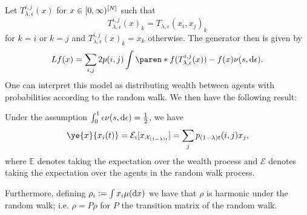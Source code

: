 \documentclass{article}
\begin{document}
Let $T_{\lambda, \epsilon}^{i, j}(x)$ for $x \in [0, \infty)^{[N]}$ such that
\[
T_{\lambda, \epsilon}^{i, j}(x)_k = T_{\lambda, \epsilon}(x_i, x_j)_k
\]
for $k = i$ or $k = j$ and $T_{\lambda, \epsilon}^{i, j}(x)_k = x_k$ otherwise. The generator then is given by
\[
Lf(x) = \sum_{i, j} 2 p(i, j) \int \paren*{f(T_{\lambda, \epsilon}^{i, j}(x)) - f(x)} \nu(s, \diff \epsilon).
\]
One can interpret this model as distributing wealth between agents with probabilities according to the random walk. We then have the following result:
\begin{theorem}
Under the assumption $\int_0^1 \epsilon \nu(s, \mathop{}\!\mathrm{d}\epsilon) = \frac{1}{2}$, we have
\[
\ye{x}{x_i(t)} = \mathcal{E}_i\brackets{x_{\mathcal{X}_{(1-\lambda)t}}} = \sum_{j} p_{(1-\lambda)t}(i, j) x_j,
\]
where $\mathbb{E}$ denotes taking the expectation over the wealth process and $\mathcal{E}$ denotes taking the expectation over the agents in the random walk process.

Furthermore, defining $\rho_i \vcentcolon= \int x_i \mu(\mathop{}\!\mathrm{d} x)$ we have that $\rho$ is harmonic under the random walk; i.e. $\rho = P \rho$ for $P$ the transition matrix of the random walk.
\end{theorem}
\end{document}
